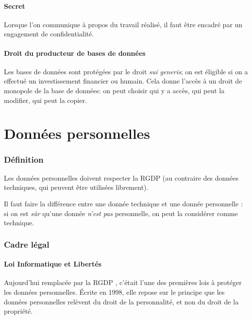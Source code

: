 \documentclass[10pt,a4paper,french]{article}
\begin{document}
\subsection{Secret}

Lorsque l'on communique à propos du travail réalisé, il faut être encadré par un engagement de confidentialité.

\subsection{Droit du producteur de bases de données}

Les bases de données sont protégées par le droit \textit{sui generis}; on est éligible si on a effectué un investissement financier ou humain. Cela donne l'accès à un droit de monopole de la base de données: on peut choisir qui y a accès, qui peut la modifier, qui peut la copier.

\part{Données personnelles}

\section{Définition}

Les données personnelles doivent respecter la RGDP (au contraire des données techniques, qui peuvent être utilisées librement).

Il faut faire la différence entre une donnée technique et une donnée personnelle : si on est \textit{sûr} qu'une donnée \textit{n'est pas} personnelle, on peut la considérer comme technique.

\section{Cadre légal}

\subsection{Loi Informatique et Libertés}\label{sec:loi-info-liberte}
Aujourd'hui remplacée par la RGDP , c'était l'une des premières lois à protéger les données personnelles. Écrite en 1998, elle repose sur le principe que les données personnelles relèvent du droit de la personnalité, et non du droit de la propriété.
\end{document}
